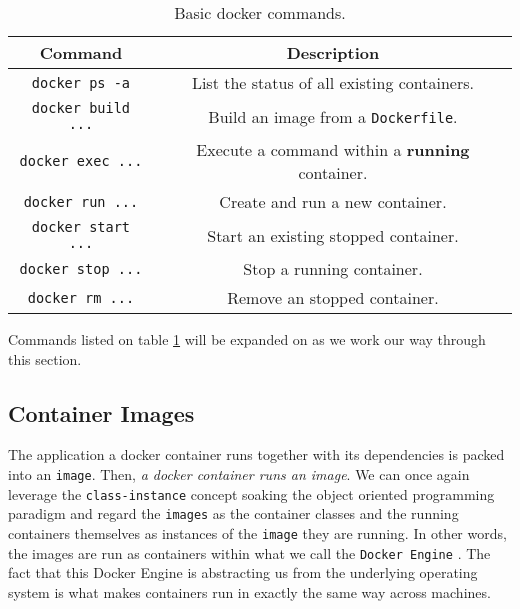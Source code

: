             \begin{table}
                \centering
                \begin{tabular}{|c|c|}
                    \hline
                    \textbf{Command} & \textbf{Description}\\
                    \hline
                    \texttt{docker ps -a} & List the status of all existing containers.\\
                    \hline
                    \texttt{docker build ...} & Build an image from a \texttt{Dockerfile}.\\
                    \hline
                    \texttt{docker exec ...} & Execute a command within a \textbf{running} container.\\
                    \hline
                    \texttt{docker run ...} & Create and run a new container.\\
                    \hline
                    \texttt{docker start ...} & Start an existing stopped container.\\
                    \hline
                    \texttt{docker stop ...} & Stop a running container.\\
                    \hline
                    \texttt{docker rm ...} & Remove an stopped container.\\
                    \hline
                \end{tabular}
                \caption{Basic docker commands.}
                \label{tab:docker-commands}
            \end{table}

            Commands listed on table \ref{tab:docker-commands} will be expanded on as we work our way through this section.\\

        \subsection{Container Images}
            The application a docker container runs together with its dependencies is packed into an \texttt{image}. Then, \textit{a docker container runs an image}. We can once again leverage the \texttt{class-instance} concept soaking the object oriented programming paradigm and regard the \texttt{images} as the container classes and the running containers themselves as instances of the \texttt{image} they are running. In other words, the images are run as containers within what we call the \texttt{Docker Engine} \cite{bib:docker-engine}. The fact that this Docker Engine is abstracting us from the underlying operating system is what makes containers run in exactly the same way across machines.\\

